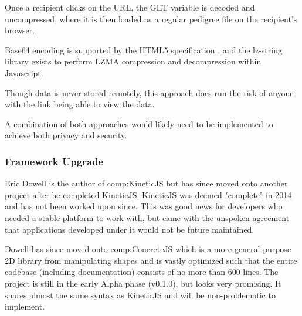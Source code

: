 \begin{enumerate}
{Once a recipient clicks on the URL, the GET variable is decoded and uncompressed, where it is then loaded as a regular pedigree file on the recipient's browser. 

Base64 encoding is supported by the HTML5 specification \cite{masinter1998data}, and the lz-string library exists \cite{lzstring} to perform LZMA compression and decompression within Javascript.

\enlargethispage{\baselineskip}
Though data is never stored remotely, this approach does run the risk of anyone with the link being able to view the data.
}
\end{enumerate}

A combination of both approaches would likely need to be implemented to achieve both privacy and security.


\subsubsection{Framework Upgrade}

Eric Dowell is the author of \gls{comp:KineticJS} but has since moved onto another project after he completed KineticJS. KineticJS was deemed "complete" in 2014 \cite{kinetictar} and has not been worked upon since. This was good news for developers who needed a stable platform to work with, but came with the unspoken agreement that applications developed under it would not be future maintained.

Dowell has since moved onto \gls{comp:ConcreteJS} \cite{concretejs} which is a more general-purpose 2D library from manipulating shapes and is vastly optimized such that the entire codebase (including documentation) consists of no more than 600 lines. The project is still in the early Alpha phase (v0.1.0), but looks very promising. It shares almost the same syntax as KineticJS and will be non-problematic to implement.

